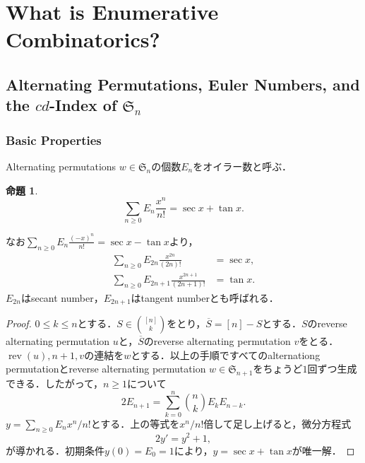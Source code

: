 \documentclass[xelatex,ja=standard,a4paper,14pt,everyparhook=compat]{bxjsarticle}
\newcommand{\fS}{\mathfrak{S}}
\theoremstyle{definition}
\newtheorem{proposition}[theorem]{命題}
\begin{document}
\section{What is Enumerative Combinatorics?}
\setcounter{subsection}{5}
\subsection{Alternating Permutations, Euler Numbers, and the $cd$-Index of $\fS_n$}

\subsubsection{Basic Properties}

Alternating permutations $w \in \fS_n$の個数$E_n$をオイラー数と呼ぶ．


\begin{proposition}
    \begin{equation*}
        \sum_{n \geq 0} E_n \frac{x^n}{n!} = \sec x + \tan x.
    \end{equation*}
\end{proposition}

なお$\sum_{n \geq 0} E_n \frac{(-x)^n}{n!} = \sec x - \tan x$より， \begin{align*}
    \sum_{n \geq 0} E_{2n} \frac{x^{2n}}{(2n)!} &= \sec x, \\
    \sum_{n \geq 0} E_{2n+1} \frac{x^{2n+1}}{(2n+1)!} &= \tan x.
\end{align*}
$E_{2n}$はsecant number，$E_{2n+1}$はtangent numberとも呼ばれる．

\begin{proof}
    $0 \leq k \leq n$とする．$S \in \binom{[n]}{k}$をとり，$\overline S = [n] - S$とする．$S$のreverse alternating permutation $u$と，$\overline S$のreverse alternating permutation $v$をとる．$\operatorname{rev}(u), n+1, v$の連結を$w$とする．以上の手順ですべてのalternationg permutationとreverse alternating permutation $w \in \fS_{n+1}$をちょうど$1$回ずつ生成できる．したがって，$n \geq 1$について \begin{equation*}
        2E_{n+1} = \sum_{k=0}^n \binom{n}{k} E_k E_{n-k}.
    \end{equation*}
    $y = \sum_{n \geq 0} E_n x^n / n!$とする．上の等式を$x^n/n!$倍して足し上げると，微分方程式 \begin{equation*}
        2y' = y^2 + 1,
    \end{equation*}
    が導かれる．初期条件$y(0) = E_0 = 1$により，$y = \sec x + \tan x$が唯一解．
\end{proof}
\end{document}
